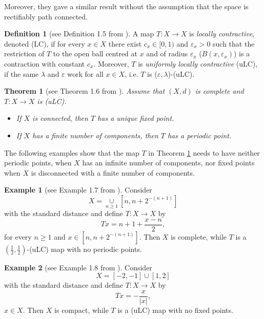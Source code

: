 \documentclass[12 pt]{article}
\theoremstyle{lema}
\theoremstyle{proposition}
\theoremstyle{theorem}
\newtheorem{theorem}{Theorem}[section]
\theoremstyle{theorem}
\theoremstyle{corollary}
\theoremstyle{definition}
\newtheorem{definition}{Definition}[section]
\theoremstyle{example}
\newtheorem{example}{Example}[section]
\begin{document}
	Moreover, they gave a similar result without the assumption that the space is rectifiably path connected.
	
	\begin{definition}[see Definition 1.5 from \cite{Cieselski}]
		A map \(T : X \to X \) is \textit{locally contractive}, denoted (LC), if for every \(x \in X\) there exist \(c_x \in [0,1)\) and $\varepsilon_x > 0$ such that the restriction of \(T\) to the open ball centred at \(x\) and of radius \(\varepsilon_x\) (\(B(x,\varepsilon_x)\)) is a contraction with constant \(c_x\). Moreover, \(T\) is \textit{uniformly locally contractive} (uLC), if the same $\lambda$ and $\varepsilon$ work for all $x \in X$, i.e. $T$ is (\(\varepsilon, \lambda\))-(uLC).
 	\end{definition}
		
	\begin{theorem}[see Theorem 1.6 from \cite{Cieselski}]
		Assume that \((X,d)\) is complete and \(T : X \to X \) is (uLC).
		\begin{itemize}
			\item[i)] If \(X\) is connected, then \(T\) has a unique fixed point.
			\item[ii)] If \(X\) has a finite number of components, then \(T\) has a periodic point.
		\end{itemize}
	\label{Th1.6}
	\end{theorem}

	The following examples show that the map \(T\) in Theorem \ref{Th1.6} needs to have neither periodic points, when \(X\) has an infinite number of components, nor fixed points when \(X\) is disconnected with a finite number of components.
	
	\begin{example}[see Example 1.7 from \cite{Cieselski}]
		Consider \[ X  = \underset{n \geq 1}{\cup} [n, n+2^{-(n+1)}]\] with the standard distance and define \(T : X \to X \) by \[Tx = n+1+\dfrac{x-n}2,\] for every \(n \geq 1\) and \(x \in [n, n+2^{-(n+1)}]\). Then \(X\) is complete, while \(T\) is a \((\frac12,\frac12)\)-(uLC) map with no periodic points.
	\end{example}

	\begin{example}[see Example 1.8 from \cite{Cieselski}]
		Consider \[ X  = [-2,-1]\cup[1,2]\] with the standard distance and define \(T : X \to X \) by \[Tx =-\dfrac{x}{|x|},\]  \(x \in X\). Then \(X\) is compact, while \(T\) is a (uLC) map with no fixed points.
	\end{example}
\end{document}
